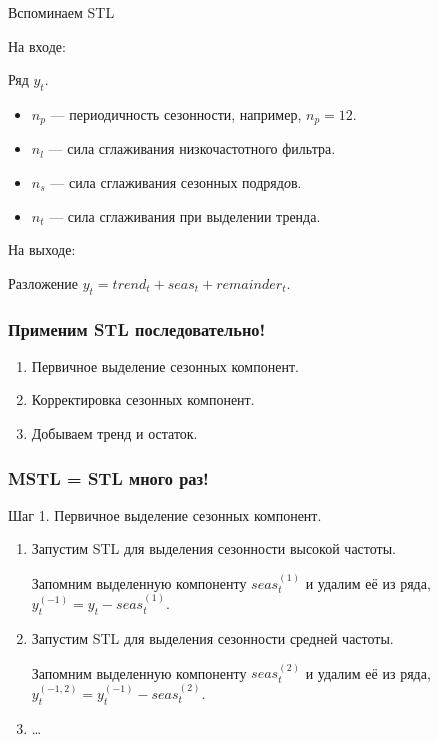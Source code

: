 \begin{frame}{Вспоминаем STL}

  \alert{На входе:}
  
  Ряд $y_t$.
  \pause
  \begin{itemize}
    \item $n_p$ — периодичность сезонности, например, $n_p=12$. \pause 
    \item $n_l$ — сила сглаживания низкочастотного фильтра.   \pause
    \item $n_s$ — сила сглаживания сезонных подряд\textit{о}в. \pause
    \item $n_t$ — сила сглаживания при выделении тренда.     
  \end{itemize}

  \pause
  \alert{На выходе:}
  
  Разложение $y_t = trend_t + seas_t + remainder_t$.  
\end{frame}
  
\begin{frame}
  \frametitle{Применим STL последовательно!}

  \begin{enumerate}[<+->]
    \item \alert{Первичное} выделение сезонных компонент. 
    \item \alert{Корректировка} сезонных компонент. 
    \item Добываем тренд и остаток. 
  \end{enumerate}

\end{frame}



\begin{frame}
  \frametitle{MSTL = STL много раз!}

  Шаг 1. Первичное выделение сезонных компонент. 

  \begin{enumerate}[<+->]
    \item Запустим STL для выделения сезонности \alert{высокой частоты}. 
    
    Запомним выделенную компоненту $seas_t^{(1)}$ и удалим её из ряда, $y_t^{(-1)} = y_t - seas_t^{(1)}$. 

    \item Запустим STL для выделения сезонности \alert{средней частоты}. 
    
    Запомним выделенную компоненту $seas_t^{(2)}$ и удалим её из ряда, $y_t^{(-1,2)}= y_t^{(-1)} - seas_t^{(2)}$. 

    \item \ldots

  \end{enumerate}

\end{frame}



